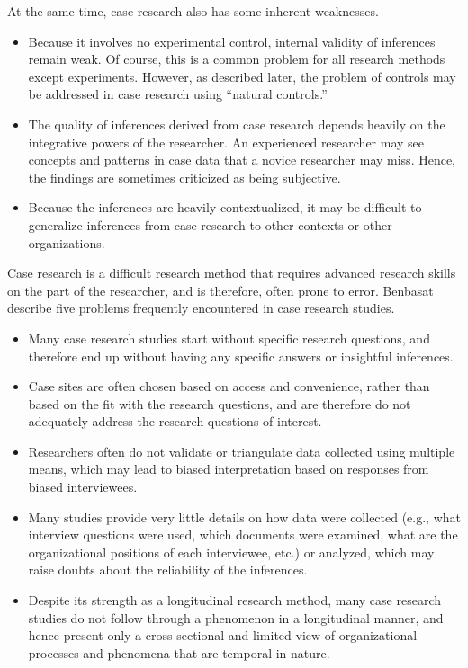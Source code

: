 At the same time, case research also has some inherent weaknesses. 

\begin{itemize}
	\item Because it involves no experimental control, internal validity of inferences remain weak. Of course, this is a common problem for all research methods except experiments. However, as described later, the problem of controls may be addressed in case research using ``natural controls.''
	
	\item The quality of inferences derived from case research depends heavily on the integrative powers of the researcher. An experienced researcher may see concepts and patterns in case data that a novice researcher may miss. Hence, the findings are sometimes criticized as being subjective.
	
	\item Because the inferences are heavily contextualized, it may be difficult to generalize inferences from case research to other contexts or other organizations.
\end{itemize}

Case research is a difficult research method that requires advanced research skills on the part of the researcher, and is therefore, often prone to error. Benbasat\cite{benbasat1987case} describe five problems frequently encountered in case research studies.

\begin{itemize}
	\item Many case research studies start without specific research questions, and therefore end up without having any specific answers or insightful inferences.
	
	\item Case sites are often chosen based on access and convenience, rather than based on the fit with the research questions, and are therefore do not adequately address the research questions of interest.
	
	\item Researchers often do not validate or triangulate data collected using multiple means, which may lead to biased interpretation based on responses from biased interviewees.
	
	\item Many studies provide very little details on how data were collected (e.g., what interview questions were used, which documents were examined, what are the organizational positions of each interviewee, etc.) or analyzed, which may raise doubts about the reliability of the inferences.
	
	\item Despite its strength as a longitudinal research method, many case research studies do not follow through a phenomenon in a longitudinal manner, and hence present only a cross-sectional and limited view of organizational processes and phenomena that are temporal in nature.
\end{itemize}

